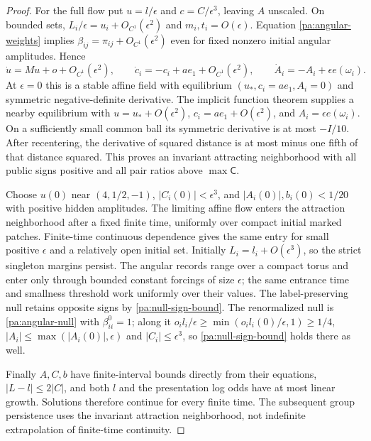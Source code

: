 \begin{proof}
For the full flow put $u=l/\epsilon$ and $c=C/\epsilon^3$, leaving $A$ unscaled. On bounded sets,
$L_i/\epsilon=u_i+O_{C^1}(\epsilon^2)$ and $m_i,t_i=O(\epsilon)$.
Equation \cref{pa:angular-weights} implies $\beta_{ij}=\pi_{ij}+O_{C^1}(\epsilon^2)$ even for fixed nonzero initial angular amplitudes. Hence
\begin{equation}
 \dot u=Mu+o+O_{C^1}(\epsilon^2),\qquad
 \dot c_i=-c_i+a e_1+O_{C^1}(\epsilon^2),\qquad
 \dot A_i=-A_i+\epsilon e(\omega_i).
 \label{pa:angular-limit}
\end{equation}
At $\epsilon=0$ this is a stable affine field with equilibrium
$(u_*,c_i=a e_1,A_i=0)$ and symmetric negative-definite derivative. The implicit function theorem supplies a nearby equilibrium with
$u=u_*+O(\epsilon^2)$, $c_i=a e_1+O(\epsilon^2)$, and $A_i=\epsilon e(\omega_i)$.
On a sufficiently small common ball its symmetric derivative is at most $-I/10$. After recentering, the derivative of squared distance is at most minus one fifth of that distance squared. This proves an invariant attracting neighborhood with all public signs positive and all pair ratios above $\max\mathsf C$.

Choose $u(0)$ near $(4,1/2,-1)$, $|C_i(0)|<\epsilon^3$, and $|A_i(0)|,b_i(0)<1/20$ with positive hidden amplitudes. The limiting affine flow enters the attraction neighborhood after a fixed finite time, uniformly over compact initial marked patches. Finite-time continuous dependence gives the same entry for small positive $\epsilon$ and a relatively open initial set. Initially $L_i=l_i+O(\epsilon^3)$, so the strict singleton margins persist. The angular records range over a compact torus and enter only through bounded constant forcings of size $\epsilon$; the same entrance time and smallness threshold work uniformly over their values. The label-preserving null retains opposite signs by \cref{pa:null-sign-bound}. The renormalized null is \cref{pa:angular-null} with $\beta^0_{ii}=1$; along it $o_il_i/\epsilon\geq\min(o_il_i(0)/\epsilon,1)\geq1/4$, $|A_i|\leq\max(|A_i(0)|,\epsilon)$ and $|C_i|\leq\epsilon^3$, so \cref{pa:null-sign-bound} holds there as well.

Finally $A,C,b$ have finite-interval bounds directly from their equations, $|L-l|\leq2|C|$, and both $l$ and the presentation log odds have at most linear growth. Solutions therefore continue for every finite time. The subsequent group persistence uses the invariant attraction neighborhood, not indefinite extrapolation of finite-time continuity.
\end{proof}


